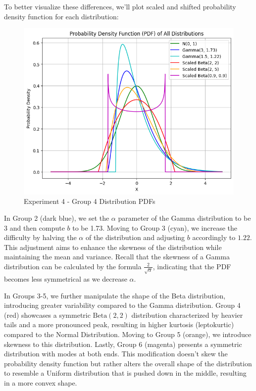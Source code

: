 \documentclass[a4paper, 12pt]{article}
\theoremstyle{definition}
\begin{document}
To better visualize these differences, we'll plot scaled and shifted probability density function for each distribution:

\begin{figure}[H] \centering
\includegraphics[width=\textwidth]{figures/exp4_pdf.png} 
\caption{Experiment 4 - Group 4 Distribution PDFs}
\label{figure:exp4_pdf}
\end{figure}

In Group 2 (dark blue), we set the $\alpha$ parameter of the Gamma distribution to be 3 and then compute $b$ to be 1.73. Moving to Group 3 (cyan), we increase the difficulty by halving the $\alpha$ of the distribution and adjusting $b$ accordingly to $1.22$. This adjustment aims to enhance the skewness of the distribution while maintaining the mean and variance. Recall that the skewness of a Gamma distribution can be calculated by the formula $\frac{2}{\sqrt{\alpha}}$, indicating that the PDF becomes less symmetrical as we decrease $\alpha$.


In Groups 3-5, we further manipulate the shape of the Beta distribution, introducing greater variability compared to the Gamma distribution. Group 4 (red) showcases a symmetric $\mathrm{Beta}(2,2)$ distribution characterized by heavier tails and a more pronounced peak, resulting in higher kurtosis (leptokurtic) compared to the Normal Distribution. Moving to Group 5 (orange), we introduce skewness to this distribution. Lastly, Group 6 (magenta) presents a symmetric distribution with modes at both ends. This modification doesn't skew the probability density function but rather alters the overall shape of the distribution to resemble a Uniform distribution that is pushed down in the middle, resulting in a more convex shape.
\end{document}
